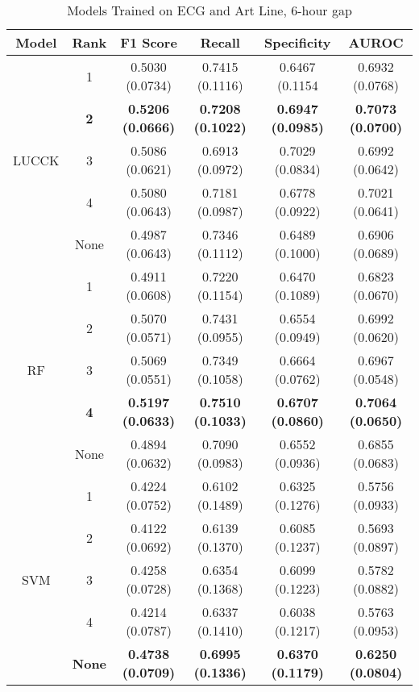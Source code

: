 \begin{table}
    \centering
    \caption{Models Trained on ECG and Art Line, 6-hour gap}
    \begin{tabular}{|c|c|c|c|c|c|}
        \hline
        Model & Rank & F1 Score & Recall & Specificity & AUROC \\
        \hline
         & 1 & 0.5030 (0.0734) & 0.7415 (0.1116) & 0.6467 (0.1154 & 0.6932 (0.0768)\\
         & \textbf{2} & \textbf{0.5206 (0.0666)} & \textbf{0.7208 (0.1022)} & \textbf{0.6947 (0.0985)} & \textbf{0.7073 (0.0700)}\\
        LUCCK & 3 & 0.5086 (0.0621) & 0.6913 (0.0972) & 0.7029 (0.0834) & 0.6992 (0.0642)\\
         & 4 & 0.5080 (0.0643) & 0.7181 (0.0987) & 0.6778 (0.0922) & 0.7021 (0.0641)\\
         & None & 0.4987 (0.0643) & 0.7346 (0.1112) & 0.6489 (0.1000) & 0.6906 (0.0689)\\
         \hline
         & 1 & 0.4911 (0.0608) & 0.7220 (0.1154) & 0.6470 (0.1089) & 0.6823 (0.0670)\\
         & 2 & 0.5070 (0.0571) & 0.7431 (0.0955) & 0.6554 (0.0949) & 0.6992 (0.0620)\\
         RF & 3 & 0.5069 (0.0551) & 0.7349 (0.1058) & 0.6664 (0.0762) & 0.6967 (0.0548)\\
         & \textbf{4} & \textbf{0.5197 (0.0633)} & \textbf{0.7510 (0.1033)} & \textbf{0.6707 (0.0860)} & \textbf{0.7064 (0.0650)}\\
         & None & 0.4894 (0.0632) & 0.7090 (0.0983) & 0.6552 (0.0936) & 0.6855 (0.0683)\\
         \hline
         & 1 & 0.4224 (0.0752) & 0.6102 (0.1489) & 0.6325 (0.1276) & 0.5756 (0.0933)\\
         & 2 & 0.4122 (0.0692) & 0.6139 (0.1370) & 0.6085 (0.1237) & 0.5693 (0.0897)\\
         SVM & 3 & 0.4258 (0.0728) & 0.6354 (0.1368) & 0.6099 (0.1223) & 0.5782 (0.0882)\\
         & 4 & 0.4214 (0.0787) & 0.6337 (0.1410) & 0.6038 (0.1217) & 0.5763 (0.0953)\\
         & \textbf{None} & \textbf{0.4738 (0.0709)} & \textbf{0.6995 (0.1336)} & \textbf{0.6370 (0.1179)} & \textbf{0.6250 (0.0804)}\\
         \hline
    \end{tabular}
\end{table}

